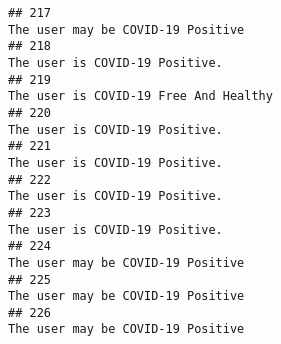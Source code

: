 \documentclass[
]{article}
\begin{document}
\begin{verbatim}
## 217                                                                                                                                                                                                                                  The user may be COVID-19 Positive
## 218                                                                                                                                                                                                                                     The user is COVID-19 Positive.
## 219                                                                                                                                                                                                                              The user is COVID-19 Free And Healthy
## 220                                                                                                                                                                                                                                     The user is COVID-19 Positive.
## 221                                                                                                                                                                                                                                     The user is COVID-19 Positive.
## 222                                                                                                                                                                                                                                     The user is COVID-19 Positive.
## 223                                                                                                                                                                                                                                     The user is COVID-19 Positive.
## 224                                                                                                                                                                                                                                  The user may be COVID-19 Positive
## 225                                                                                                                                                                                                                                  The user may be COVID-19 Positive
## 226                                                                                                                                                                                                                                  The user may be COVID-19 Positive

\end{verbatim}
\end{document}
